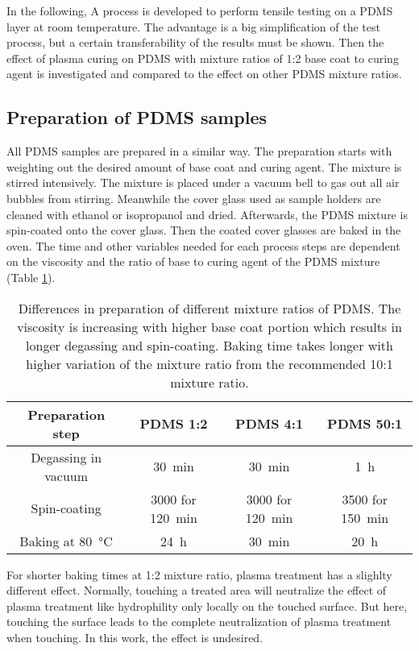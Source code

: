 In the following, A process is developed to perform tensile testing on a PDMS layer at room temperature. The advantage is a big simplification of the test process, but a certain transferability of the results must be shown. Then the effect of plasma curing on PDMS with mixture ratios of 1:2 base coat to curing agent is investigated and compared to the effect on other PDMS mixture ratios.

\subsection{Preparation of PDMS samples}

All PDMS samples are prepared in a similar way. The preparation starts with weighting out the desired amount of base coat and curing agent. The mixture is stirred intensively. The mixture is placed under a vacuum bell to gas out all air bubbles from stirring. Meanwhile the cover glass used as sample holders are cleaned with ethanol or isopropanol and dried. Afterwards, the PDMS mixture is spin-coated onto the cover glass. Then the coated cover glasses are baked in the oven. The time and other variables needed for each process steps are dependent on the viscosity and the ratio of base to curing agent of the PDMS mixture (Table \ref{table:preparationPDMSmixturereatios}). 

\begin{table}
	\centering
	\begin{tabular}{|c|c|c|c|}
		\hline
		 Preparation step & PDMS 1:2 & PDMS 4:1 & PDMS 50:1 \\
		\hline
		\hline
		Degassing in vacuum & \SI{30}{\minute} & \SI{30}{\minute} & \SI{1}{\hour}\\
		\hline
		Spin-coating & \SI{3000}{\rpm} for \SI{120}{\minute}  & \SI{3000}{\rpm} for \SI{120}{\minute} & \SI{3500}{\rpm} for \SI{150}{\minute} \\
		\hline
		Baking at \SI{80}{\degreeCelsius} & \SI{24}{\hour} & \SI{30}{\minute} & \SI{20}{\hour}\\
		\hline	
	\end{tabular}
	\caption{Differences in preparation of different mixture ratios of PDMS. The viscosity is increasing with higher base coat portion which results in longer degassing and spin-coating. Baking time takes longer with higher variation of the mixture ratio from the recommended 10:1 mixture ratio.}
	\label{table:preparationPDMSmixturereatios}
\end{table}

For shorter baking times at 1:2 mixture ratio, plasma treatment has a slighlty different effect. Normally, touching a treated area will neutralize the effect of plasma treatment like hydrophility only locally on the touched surface. But here, touching the surface leads to the complete neutralization of plasma treatment when touching. In this work, the effect is undesired.

